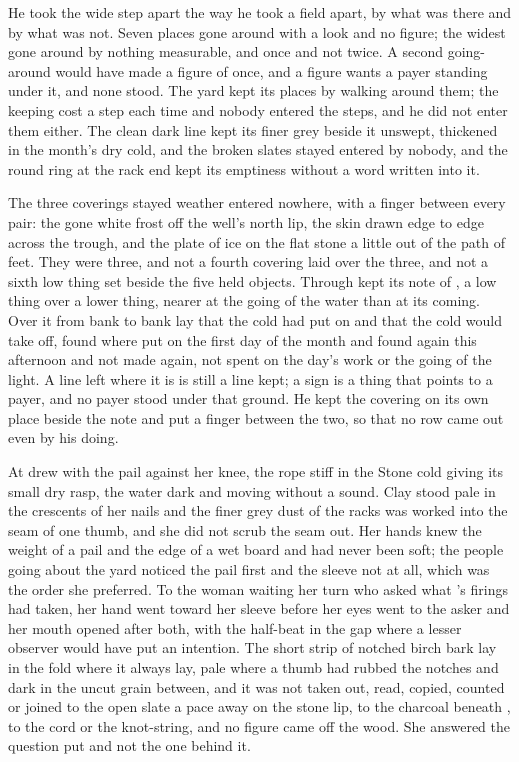 He took the wide step apart the way he took a field apart, by what was there and by what was not. Seven places gone around with a look and no figure; the widest gone around by nothing measurable, and once and not twice. A second going-around would have made a figure of once, and a figure wants a payer standing under it, and none stood. The yard kept its places by walking around them; the keeping cost a step each time and nobody entered the steps, and he did not enter them either. The clean dark line kept its finer grey beside it unswept, thickened in the month's dry cold, and the broken slates stayed entered by nobody, and the round ring at the rack end kept its emptiness without a word written into it.

\scenebreak

The three coverings stayed weather entered nowhere, with a finger between every pair: the gone white frost off the well's north lip, the skin drawn edge to edge across the trough, and the plate of ice on the flat stone a little out of the path of feet. They were three, and not a fourth covering laid over the three, and not a sixth low thing set beside the five held objects. Through   kept its note of , a low thing over a lower thing, nearer at the going of the water than at its coming. Over it from bank to bank lay  that the cold had put on and that the cold would take off, found where put on the first day of the month and found again this afternoon and not made again, not spent on the day's work or the going of the light. A line left where it is is still a line kept; a sign is a thing that points to a payer, and no payer stood under that ground. He kept the covering on its own place beside the note and put a finger between the two, so that no row came out even by his doing.

At   drew with the pail against her knee, the rope stiff in the Stone cold giving its small dry rasp, the water dark and moving without a sound. Clay stood pale in the crescents of her nails and the finer grey dust of the racks was worked into the seam of one thumb, and she did not scrub the seam out. Her hands knew the weight of a pail and the edge of a wet board and had never been soft; the people going about the yard noticed the pail first and the sleeve not at all, which was the order she preferred. To the woman waiting her turn who asked what 's firings had taken, her hand went toward her sleeve before her eyes went to the asker and her mouth opened after both, with the half-beat in the gap where a lesser observer would have put an intention. The short strip of notched birch bark lay in the fold where it always lay, pale where a thumb had rubbed the notches and dark in the uncut grain between, and it was not taken out, read, copied, counted or joined to the open slate a pace away on the stone lip, to the charcoal beneath , to the cord or the knot-string, and no figure came off the wood. She answered the question put and not the one behind it.

